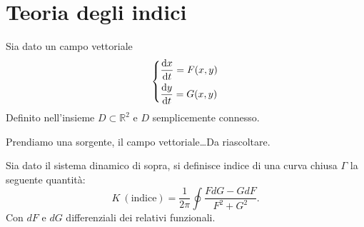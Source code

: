 \section{Teoria degli indici}%
\label{sub:Teoria degli indici}
Sia dato un campo vettoriale 
\[
\begin{dcases}
    \frac{\text{d} x}{\text{d} t} = F(x, y) \\
    \frac{\text{d} y}{\text{d} t} = G(x, y) 
\end{dcases}
\]
Definito nell'insieme $D \subset \mathbb{R}^2$ e $D$ semplicemente connesso.
\begin{exmp}[]
    Prendiamo una sorgente, il campo vettoriale\ldots Da riascoltare. 
\end{exmp}
\noindent
\begin{defn}
    Sia dato il sistema dinamico di sopra, si definisce indice di una curva chiusa $\Gamma$ la seguente quantità:
    \[
	K \ (\text{indice}) = \frac{1}{2\pi}\oint \frac{FdG-GdF}{F^2+G^2}
    .\] 
    Con $dF$ e $dG$ differenziali dei relativi funzionali.
\end{defn}
\noindent
